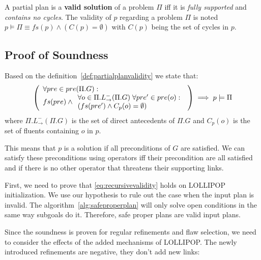 \begin{definition}\label{def:partialplanvalidity}

A partial plan is a \textbf{valid solution} of a problem \(\Pi\) iff it
is \emph{fully supported} and \emph{contains no cycles}. The validity of
\(p\) regarding a problem \(\Pi\) is noted
\(p \models \Pi \equiv fs(p) \land \left(C(p) = \emptyset \right)\) with
\(C(p)\) being the set of cycles in \(p\).

\end{definition}

\subsection{Proof of Soundness}\label{proof-of-soundness}

Based on the definition~\ref{def:partialplanvalidity} we state that:
\begin{equation}
\left(
\begin{array}{l}
    \forall pre \in pre(\Pi.G): \\
    fs(pre) \land
    \begin{array}{l}
        \forall o \in \Pi.L^-_{\rightarrow}(\Pi.G) \thickspace \forall pre' \in pre(o): \\
        \left(fs(pre')\land C_p(o) = \emptyset\right)
    \end{array}
\end{array}
\right) \implies p \models \Pi\label{eq:recursivevalidity}\end{equation}
where \(\Pi.L^-_{\rightarrow}(\Pi.G)\) is the set of direct antecedents
of \(\Pi.G\) and \(C_p(o)\) is the set of fluents containing \(o\) in
\(p\).

This means that \(p\) is a solution if all preconditions of \(G\) are
satisfied. We can satisfy these preconditions using operators iff their
precondition are all satisfied and if there is no other operator that
threatens their supporting links.

First, we need to prove that \cref{eq:recursivevalidity} holds on
LOLLIPOP initialization. We use our hypothesis to rule out the case when
the input plan is invalid. The algorithm~\ref{alg:safeproperplan} will
only solve open conditions in the same way subgoals do it. Therefore,
safe proper plans are valid input plans.

Since the soundness is proven for regular refinements and flaw
selection, we need to consider the effects of the added mechanisms of
LOLLIPOP. The newly introduced refinements are negative, they don't add
new links:

